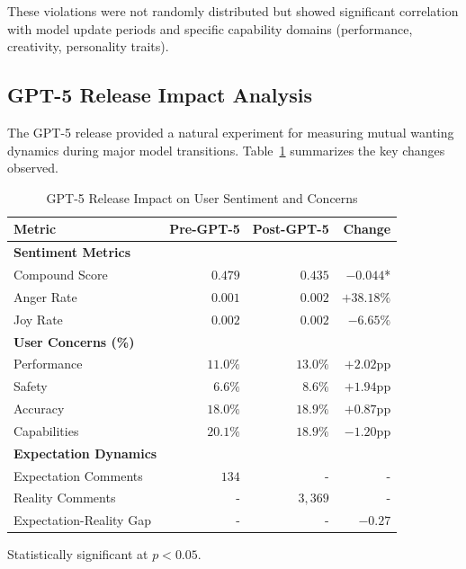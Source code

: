 \documentclass{article}
\begin{document}
These violations were not randomly distributed but showed significant correlation with model update periods and specific capability domains (performance, creativity, personality traits).

\subsection{GPT-5 Release Impact Analysis}

The GPT-5 release provided a natural experiment for measuring mutual wanting dynamics during major model transitions. Table~\ref{tab:gpt5_impact} summarizes the key changes observed.

\begin{table}[htbp]
\centering
\begin{threeparttable}
\caption{GPT-5 Release Impact on User Sentiment and Concerns}
\label{tab:gpt5_impact}
\begin{tabular}{@{}lrrr@{}}
\toprule
Metric & Pre-GPT-5 & Post-GPT-5 & Change \\
\midrule
\textbf{Sentiment Metrics} & & & \\
Compound Score & $0.479$ & $0.435$ & $-0.044$* \\
Anger Rate & $0.001$ & $0.002$ & $+38.18\%$ \\
Joy Rate & $0.002$ & $0.002$ & $-6.65\%$ \\
\midrule
\textbf{User Concerns (\%)} & & & \\
Performance & $11.0\%$ & $13.0\%$ & $+2.02$pp \\
Safety & $6.6\%$ & $8.6\%$ & $+1.94$pp \\
Accuracy & $18.0\%$ & $18.9\%$ & $+0.87$pp \\
Capabilities & $20.1\%$ & $18.9\%$ & $-1.20$pp \\
\midrule
\textbf{Expectation Dynamics} & & & \\
Expectation Comments & $134$ & - & - \\
Reality Comments & - & $3,369$ & - \\
Expectation-Reality Gap & - & - & $-0.27$ \\
\bottomrule
\end{tabular}
\begin{tablenotes}
\small
\item[*] Statistically significant at $p<0.05$.
\end{tablenotes}
\end{threeparttable}
\end{table}
\end{document}
